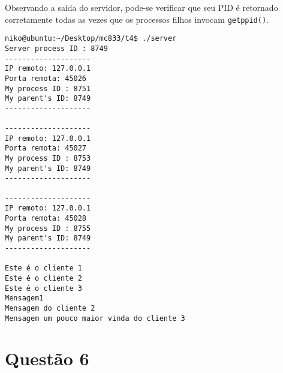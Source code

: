 \documentclass[a4paper,10pt]{article}
\begin{document}
Observando a saída do servidor, pode-se verificar que seu PID é retornado corretamente todas as vezes que os processos filhos invocam {\tt getppid()}.

\begin{lstlisting}
niko@ubuntu:~/Desktop/mc833/t4$ ./server 
Server process ID : 8749
--------------------
IP remoto: 127.0.0.1
Porta remota: 45026
My process ID : 8751
My parent's ID: 8749
--------------------

--------------------
IP remoto: 127.0.0.1
Porta remota: 45027
My process ID : 8753
My parent's ID: 8749
--------------------

--------------------
IP remoto: 127.0.0.1
Porta remota: 45028
My process ID : 8755
My parent's ID: 8749
--------------------

Este é o cliente 1
Este é o cliente 2
Este é o cliente 3
Mensagem1
Mensagem do cliente 2
Mensagem um pouco maior vinda do cliente 3

\end{lstlisting}

\section{Questão 6}
\end{document}

